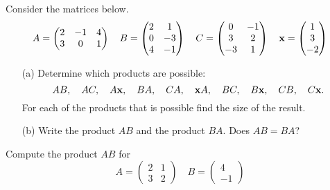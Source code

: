 \begin{problem}
    Consider the matrices below.
    \[ A = \begin{pmatrix} 2 & -1 & 4 \\ 3 & 0 & 1 \end{pmatrix} \quad B = \begin{pmatrix}
            2 & 1 \\ 0 & -3 \\ 4 & -1 \end{pmatrix} \quad C = \begin{pmatrix} 0 & -1 \\ 3
            & 2 \\ -3 & 1 \end{pmatrix} \quad {\bf x} = \begin{pmatrix} 1 \\ 3 \\ -2
    \end{pmatrix} \]
    \begin{enumerate}
        \item[(a)] Determine which products are possible:
            \[ AB, \quad AC, \quad A{\bf x}, \quad BA, \quad CA, \quad {\bf x} A, \quad BC,
            \quad B {\bf x}, \quad CB, \quad C{\bf x}. \]
            For each of the products that is possible find the size of the result.
        \item[(b)] Write the product $AB$ and the product $BA$.  Does $AB = BA$?
    \end{enumerate}
\end{problem}


\begin{problem}
    Compute the product $AB$ for 
    \[ A = \begin{pmatrix} 2 & 1 \\ 3 & 2 \end{pmatrix} \quad B = \begin{pmatrix} 4 \\ -1
        \end{pmatrix} \]
\end{problem}
\solution{
    \[ AB = \begin{pmatrix} 7 \\ 10 \end{pmatrix} \]
}

%             

